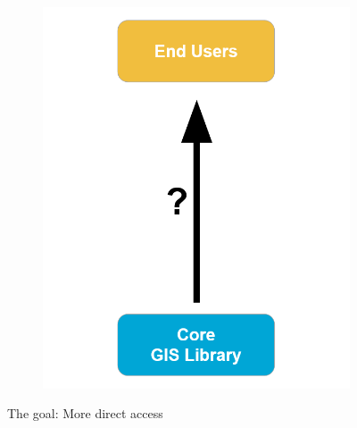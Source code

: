 \begin{figure}
  \centering
  \begin{subfigure}[b]{0.40\linewidth}
  \includegraphics[width=\linewidth]{layers-simple.png}
  \end{subfigure}%
  \caption{The goal: More direct access}
  \label{fig:goal}
\end{figure}

